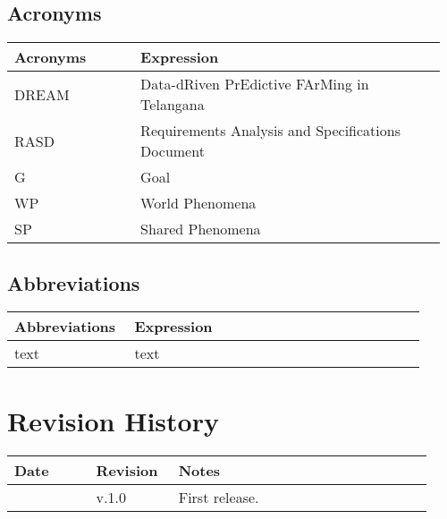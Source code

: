 \subsection{Acronyms}

\begin{center}
	\begin{tabular}{@{}p{0.28\linewidth} p{0.68\linewidth}@{}}
		\toprule
		\textbf{Acronyms}   & \textbf{Expression}\\
		\midrule
		DREAM               & Data-dRiven PrEdictive FArMing in Telangana\\
		RASD                & Requirements Analysis and Specifications Document\\
		G                   & Goal\\
		WP                  & World Phenomena\\
		SP                  & Shared Phenomena\\
		\bottomrule
	\end{tabular}
\end{center}

\subsection{Abbreviations}
\begin{center}
	\begin{tabular}{@{}p{0.28\linewidth} p{0.68\linewidth}@{}}
		\toprule
		\textbf{Abbreviations}  & \textbf{Expression}\\
		\midrule
	    text & text\\
		\bottomrule
	\end{tabular}
\end{center}

\section{Revision History}

\begin{center}
	\begin{tabular}{@{}p{0.18\linewidth} p{0.18\linewidth} p{0.57\linewidth}@{}}
		\toprule
		\textbf{Date}   & \textbf{Revision} & \textbf{Notes}\\
		\midrule
		\date{}         & v.1.0             & First release.\\
		\bottomrule
	\end{tabular}
\end{center}

